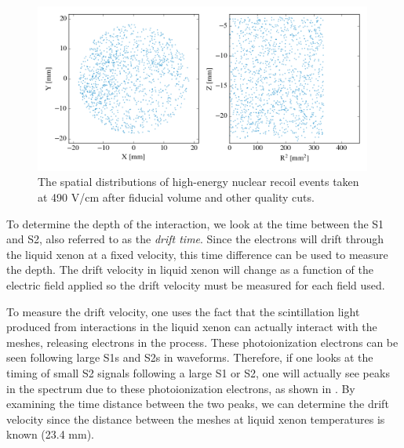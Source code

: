 \begin{figure}[t]
        \centering
	\includegraphics[width=0.99\textwidth]{nerix_position_reconstruction}
	\caption{The spatial distributions of high-energy nuclear recoil events taken at 490 V/cm after fiducial volume and other quality cuts.}
	\label{fig:nerix_position_reconstruction}
\end{figure}

To determine the depth of the interaction, we look at the time between the S1 and S2, also referred to as the \textit{drift time}.  Since the electrons will drift through the liquid xenon at a fixed velocity, this time difference can be used to measure the depth.  The drift velocity in liquid xenon will change as a function of the electric field applied so the drift velocity must be measured for each field used.

To measure the drift velocity, one uses the fact that the scintillation light produced from interactions in the liquid xenon can actually interact with the meshes, releasing electrons in the process.  These photoionization electrons can be seen following large S1s and S2s in waveforms.  Therefore, if one looks at the timing of small S2 signals following a large S1 or S2, one will actually see peaks in the spectrum due to these photoionization electrons, as shown in .  By examining the time distance between the two peaks, we can determine the drift velocity since the distance between the meshes at liquid xenon temperatures is known (23.4 mm).

